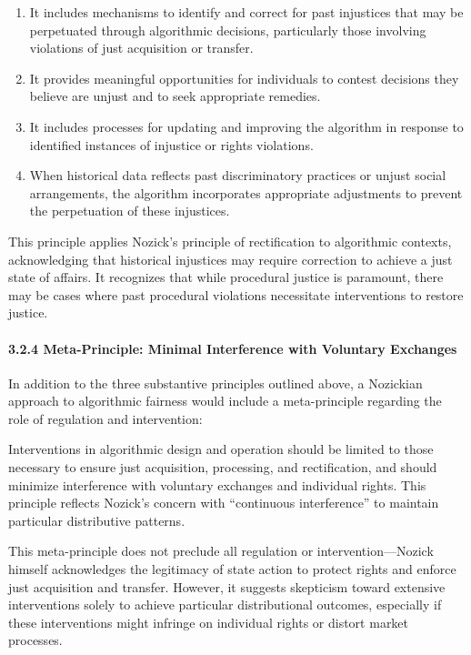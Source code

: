 \begin{enumerate}
\def\labelenumi{\arabic{enumi}.}
\tightlist
\item
  It includes mechanisms to identify and correct for past injustices
  that may be perpetuated through algorithmic decisions, particularly
  those involving violations of just acquisition or transfer.
\item
  It provides meaningful opportunities for individuals to contest
  decisions they believe are unjust and to seek appropriate remedies.
\item
  It includes processes for updating and improving the algorithm in
  response to identified instances of injustice or rights violations.
\item
  When historical data reflects past discriminatory practices or unjust
  social arrangements, the algorithm incorporates appropriate
  adjustments to prevent the perpetuation of these injustices.
\end{enumerate}

This principle applies Nozick's principle of rectification to
algorithmic contexts, acknowledging that historical injustices may
require correction to achieve a just state of affairs. It recognizes
that while procedural justice is paramount, there may be cases where
past procedural violations necessitate interventions to restore justice.

\paragraph{3.2.4 Meta-Principle: Minimal Interference with Voluntary
Exchanges}\label{meta-principle-minimal-interference-with-voluntary-exchanges}

In addition to the three substantive principles outlined above, a
Nozickian approach to algorithmic fairness would include a
meta-principle regarding the role of regulation and intervention:

Interventions in algorithmic design and operation should be limited to
those necessary to ensure just acquisition, processing, and
rectification, and should minimize interference with voluntary exchanges
and individual rights. This principle reflects Nozick's concern with
``continuous interference'' to maintain particular distributive
patterns.

This meta-principle does not preclude all regulation or
intervention---Nozick himself acknowledges the legitimacy of state
action to protect rights and enforce just acquisition and transfer.
However, it suggests skepticism toward extensive interventions solely to
achieve particular distributional outcomes, especially if these
interventions might infringe on individual rights or distort market
processes.

